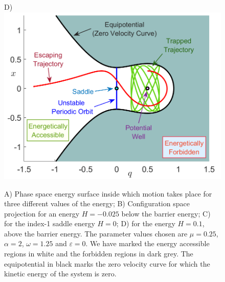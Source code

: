 \documentclass[8pt]{article}
\begin{document}
\begin{figure}[!ht]
\begin{center}
		D)\includegraphics[scale=0.26]{fig7d}
	\end{center}
	
	\caption{A) Phase space energy surface inside which motion takes place for three different values of the energy; B) Configuration space projection for an energy $H = -0.025$ below the barrier energy; C) for the index-1 saddle energy $H = 0$; D) for the energy $H = 0.1$, above the barrier energy. The parameter values chosen are $\mu = 0.25$, $\alpha = 2$, $\omega = 1.25$ and $\varepsilon = 0$. We have marked the energy accessible regions in white and the forbidden regions in dark grey. The equipotential in black marks the zero velocity curve for which the kinetic energy of the system is zero.}
	\label{fig:EnergySurf_Hills}
\end{figure}
\end{document}
